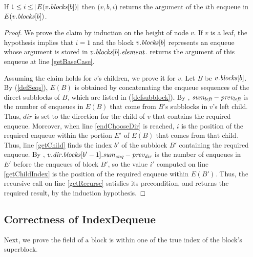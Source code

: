 \begin{lemma}\label{lem::get}
If $1\leq i\leq |E(v.\mbox{\textit{blocks}}[b])|$ then ($v,b,i$) returns the argument of the $i$th enqueue in $E(v.\mbox{\textit{blocks}}[b])$.
\end{lemma}
\begin{proof}
We prove the claim by induction on the height of node $v$.
If $v$ is a leaf, the hypothesis implies that $i=1$ and the block $v.\mbox{\textit{blocks}}[b]$ represents 
an enqueue whose argument is stored in $v.\mbox{\textit{blocks}}[b].\mbox{\textit{element}}$.
 returns the argument of this enqueue at line \ref{getBaseCase}.

Assuming the claim holds for $v$'s children, we prove it for $v$.
Let $B$ be $v.\mbox{\textit{blocks}}[b]$.
By (\ref{defSeqs}),
$E(B)$ is obtained by concatenating the enqueue sequences of the direct subblocks
of $B$, which are listed in (\ref{defsubblock}).
By , $\mbox{\textnormal{\textit{sum\textsubscript{left}}}}-\mbox{\textnormal{\textit{prev\textsubscript{left}}}}$ is the number
of enqueues in $E(B)$ that come from $B$'s subblocks in $v$'s left child.
Thus, $dir$ is set to the direction for the child of $v$ that contains the required enqueue.
Moreover, when line \ref{endChooseDir} is reached, $i$ is the position of the required enqueue within the portion $E'$ of $E(B)$ that comes from that child.
Thus,  line \ref{getChild} finds the index $b'$ of the subblock $B'$ containing the required enqueue.
By , $v.\mbox{\textnormal{\textit{dir.blocks}}}[b'-1].\mbox{\textnormal{\textit{sum\textsubscript{enq}}}} - \mbox{\textnormal{\textit{prev\textsubscript{dir}}}}$ is the number of 
enqueues in $E'$ before the enqueues of block $B'$, so
the value $i'$ computed on line \ref{getChildIndex} is the position of the required enqueue within $E(B')$.
Thus, the recursive call on line \ref{getRecurse} satisfies its precondition, and 
returns the required result, by the induction hypothesis.
\end{proof}

\subsection{Correctness of IndexDequeue}

Next, we prove the  field of a block is within one of the true index of the block's superblock.

